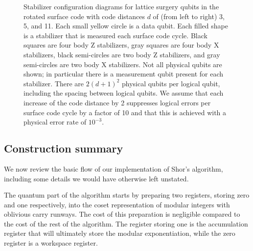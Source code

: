 \documentclass[a4paper, onecolumn, accepted=2021-03-29]{quantumarticle}
\begin{document}
\begin{figure}[ht]
    \caption{
        Stabilizer configuration diagrams for lattice surgery qubits in the rotated surface code with code distances $d$ of (from left to right) 3, 5, and 11.
        Each small yellow circle is a data qubit.
        Each filled shape is a stabilizer that is measured each surface code cycle.
        Black squares are four body Z stabilizers, gray squares are four body X stabilizers, black semi-circles are two body Z stabilizers, and gray semi-circles are two body X stabilizers.
        Not all physical qubits are shown; in particular there is a measurement qubit present for each stabilizer.
        There are $2 (d+1)^2$ physical qubits per logical qubit, including the spacing between logical qubits.
        We assume that each increase of the code distance by 2 suppresses logical errors per surface code cycle by a factor of 10 and that this is achieved with a physical error rate of $10^{-3}$.
    }
    \label{fig:lattice-surgery-qubit}
\end{figure}


\subsection{Construction summary}

We now review the basic flow of our implementation of Shor's algorithm, including some details we would have otherwise left unstated.

The quantum part of the algorithm starts by preparing two registers, storing zero and one respectively, into the coset representation of modular integers with oblivious carry runways.
The cost of this preparation is negligible compared to the cost of the rest of the algorithm.
The register storing one is the accumulation register that will ultimately store the modular exponentiation, while the zero register is a workspace register.
\end{document}
